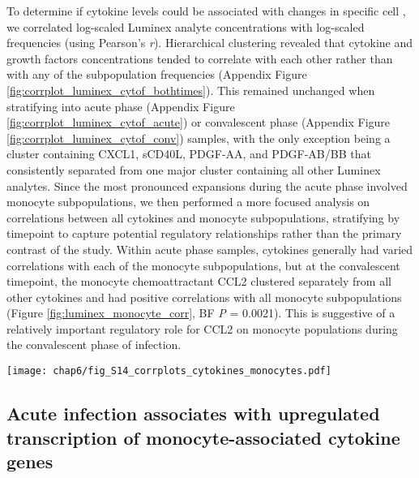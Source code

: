 To determine if cytokine levels could be associated with changes in specific cell \subcommunities{}, we correlated log-scaled Luminex analyte concentrations with log-scaled \subcommunity{} frequencies (using Pearson’s \emph{r}). Hierarchical clustering revealed that cytokine and growth factors concentrations tended to correlate with each other rather than with any of the subpopulation frequencies (Appendix Figure \ref{fig:corrplot_luminex_cytof_bothtimes}). This remained unchanged when stratifying into acute phase (Appendix Figure \ref{fig:corrplot_luminex_cytof_acute}) or convalescent phase (Appendix Figure \ref{fig:corrplot_luminex_cytof_conv}) samples, with the only exception being a cluster containing CXCL1, sCD40L, PDGF-AA, and PDGF-AB/BB that consistently separated from one major cluster containing all other Luminex analytes. Since the most pronounced expansions during the acute phase involved monocyte subpopulations, we then performed a more focused analysis on correlations between all cytokines and monocyte subpopulations, stratifying by timepoint to capture potential regulatory relationships rather than the primary contrast of the study. Within acute phase samples, cytokines generally had varied correlations with each of the monocyte subpopulations, but at the convalescent timepoint, the monocyte chemoattractant CCL2 clustered separately from all other cytokines and had positive correlations with all monocyte subpopulations (Figure \ref{fig:luminex_monocyte_corr}, BF \emph{P} = 0.0021). This is suggestive of a relatively important regulatory role for CCL2 on monocyte populations during the convalescent phase of infection.

\begin{figure*}[hb]
  \centering
  \texttt{[image: chap6/fig\_S14\_corrplots\_cytokines\_monocytes.pdf]}
  \caption[Clustered heatmap of Pearson correlations between log-scaled serum cytokine concentration and log-scaled monocyte subphenotype frequencies]{
  \textbf{Clustered heatmap of Pearson correlations between log-scaled serum cytokine concentration and log-scaled monocyte subphenotype frequencies.} A, within acute phase samples. B, within convalescent phase samples.
  }
  \label{fig:luminex_monocyte_corr}
\end{figure*}

\subsection{Acute infection associates with upregulated transcription of monocyte-associated cytokine genes}

